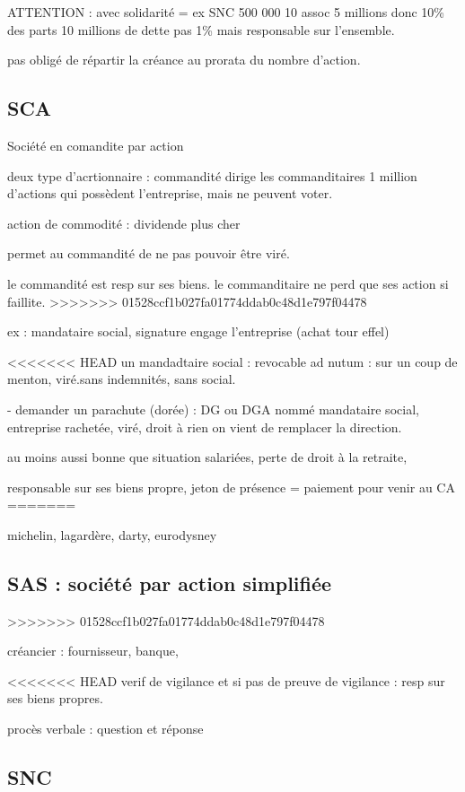 \documentclass[a4paper,12pt]{article}
\begin{document}
ATTENTION : avec solidarité = ex SNC 500 000 10 assoc 5 millions donc 10\% des parts
10 millions de dette pas 1\% mais responsable sur l'ensemble.

pas obligé de répartir la créance au prorata du nombre d'action.


\subsection{SCA}

Société en comandite par action

deux type d'acrtionnaire : commandité dirige
les commanditaires 1 million d'actions qui possèdent l'entreprise,
mais ne peuvent voter.

action de commodité : dividende plus cher

permet au commandité de ne pas pouvoir être viré.


le commandité est resp sur ses biens.
le commanditaire ne perd que ses action si faillite.
>>>>>>> 01528ccf1b027fa01774ddab0c48d1e797f04478


ex : mandataire social, signature engage l'entreprise (achat tour effel)

<<<<<<< HEAD
un mandadtaire social : revocable ad nutum : sur un coup de menton, viré.sans indemnités, sans social.

- demander un parachute (dorée) :  DG ou DGA nommé mandataire social, entreprise rachetée, viré, droit à rien
on vient de remplacer la direction.

au moins aussi bonne que situation salariées, perte de droit à la retraite,

responsable sur ses biens propre, jeton de présence = paiement pour venir au CA
=======


michelin, lagardère,  darty, eurodysney

\subsection{SAS : société par action simplifiée}
>>>>>>> 01528ccf1b027fa01774ddab0c48d1e797f04478

créancier : fournisseur,  banque,

<<<<<<< HEAD
verif de vigilance et si pas de preuve de vigilance : resp sur ses biens propres. 

procès verbale : question et réponse     

\subsection{SNC}
\end{document}

